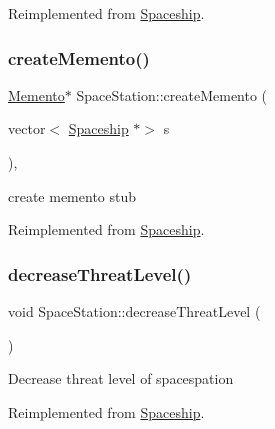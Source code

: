 Reimplemented from \hyperlink{classSpaceship_a90e1321cdbcb459b98b75ab39cef867d}{Spaceship}.

\mbox{\label{classSpaceStation_a7396c4080f29ca9c20975f831008b011}} 
\subsubsection{\texorpdfstring{create\+Memento()}{createMemento()}}
{\footnotesize\ttfamily \hyperlink{classMemento}{Memento}$\ast$ Space\+Station\+::create\+Memento (\begin{DoxyParamCaption}\item[{vector$<$ \hyperlink{classSpaceship}{Spaceship} $\ast$$>$}]{s }\end{DoxyParamCaption})\hspace{0.3cm}{\ttfamily [inline]}, {\ttfamily [virtual]}}

create memento stub 

Reimplemented from \hyperlink{classSpaceship_a6d272f846b019dec8226ddab65648a7b}{Spaceship}.

\mbox{\label{classSpaceStation_a0cb67593dc02495793635adb66f595e9}} 
\subsubsection{\texorpdfstring{decrease\+Threat\+Level()}{decreaseThreatLevel()}}
{\footnotesize\ttfamily void Space\+Station\+::decrease\+Threat\+Level (\begin{DoxyParamCaption}{ }\end{DoxyParamCaption})\hspace{0.3cm}{\ttfamily [virtual]}}

Decrease threat level of spacespation 

Reimplemented from \hyperlink{classSpaceship_a73a1eefd211e9a2063d924ee85f0c0c7}{Spaceship}.

\mbox{\label{classSpaceStation_a4a3c46e04527ecb72d19a1187dcfd31a}} 

